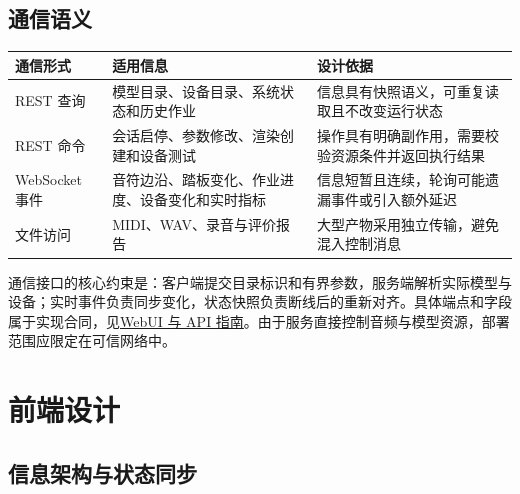 \subsection{通信语义}\label{src-experiment-case3-api}

\begin{longtable}[]{@{}
  >{\raggedright\arraybackslash}p{}
  >{\raggedright\arraybackslash}p{}
  >{\raggedright\arraybackslash}p{}@{}}
\toprule\noalign{}
\begin{minipage}[b]{\linewidth}\raggedright
通信形式
\end{minipage} & \begin{minipage}[b]{\linewidth}\raggedright
适用信息
\end{minipage} & \begin{minipage}[b]{\linewidth}\raggedright
设计依据
\end{minipage} \\
\midrule\noalign{}
\endhead
\bottomrule\noalign{}
\endlastfoot
REST 查询 & 模型目录、设备目录、系统状态和历史作业 &
信息具有快照语义，可重复读取且不改变运行状态 \\
REST 命令 & 会话启停、参数修改、渲染创建和设备测试 &
操作具有明确副作用，需要校验资源条件并返回执行结果 \\
WebSocket 事件 & 音符边沿、踏板变化、作业进度、设备变化和实时指标 &
信息短暂且连续，轮询可能遗漏事件或引入额外延迟 \\
文件访问 & MIDI、WAV、录音与评价报告 &
大型产物采用独立传输，避免混入控制消息 \\
\end{longtable}

通信接口的核心约束是：客户端提交目录标识和有界参数，服务端解析实际模型与设备；实时事件负责同步变化，状态快照负责断线后的重新对齐。具体端点和字段属于实现合同，见\href{https://github.com/zhouxzh/Ascend310/blob/main/samples/case3/docs/02-webui.md}{WebUI
与 API
指南}。由于服务直接控制音频与模型资源，部署范围应限定在可信网络中。

\section{前端设计}\label{src-experiment-case3-frontend}

\subsection{信息架构与状态同步}\label{src-experiment-case3-frontend-stack}

